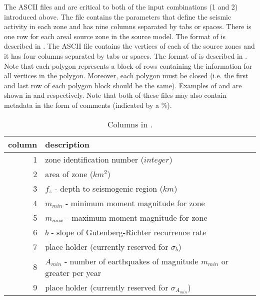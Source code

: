  The ASCII files
 and
 are critical
to both of the input combinations (1 and 2) introduced above. The
 file  contains
the parameters that define the seismic activity in each zone and
has nine columns separated by tabs or spaces. There is one row for
each areal source zone in the source model. The format of
 is described
in . The ASCII file
 contains the
vertices of each of the source zones and it has four columns
separated by tabs or spaces. The format of
 is described
in . Note that each polygon
represents a block of rows containing the information for all
vertices in the polygon. Moreover, each polygon must be closed
(i.e. the first and last row of each polygon block should be the
same). Examples of 
and  are shown in
 and  respectively.
Note that both of these files may also contain metadata in the
form of comments (indicated by a \%).


\begin{table}
\centering \caption{Columns in
.}
 \label{tab:site-loc-par-sourcezones}
\vspace{0.8em}
\begin{tabular}{r|p{}}
\hline
column & description \\
\hline
1 & zone identification number ($integer$) \\
2 & area of zone ($km^2$) \\
3 & $f_z$ - depth to seismogenic region ($km$) \\
4 & $m_{min}$ - minimum moment magnitude for zone \\
5 & $m_{max}$ - maximum moment magnitude for zone \\
6 & $b$ - slope of Gutenberg-Richter recurrence rate \\
7 & place holder (currently reserved for $\sigma_b$) \\
8 & $A_{min}$ - number of earthquakes of magnitude $m_{min}$ or greater per year\\
9 & place holder (currently reserved for $\sigma_{A_{min}}$) \\
 \hline
\end{tabular}
\end{table}

